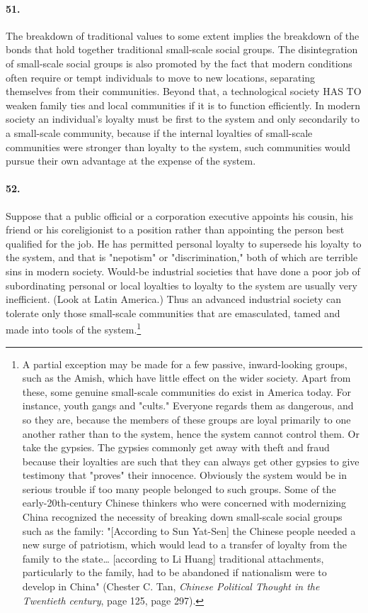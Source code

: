 \documentclass[12pt]{book}
\begin{document}
\paragraph{51.} The breakdown of traditional values to some extent implies the breakdown of the bonds that hold together traditional small-scale social groups. The disintegration of small-scale social groups is also promoted by the fact that modern conditions often require or tempt individuals to move to new locations, separating themselves from their communities.  Beyond that, a technological society HAS TO weaken family ties and local communities if it is to function efficiently. In modern society an individual's loyalty must be first to the system and only secondarily to a small-scale community, because if the internal loyalties of small-scale communities were stronger than loyalty to the system, such communities would pursue their own advantage at the expense of the system.


\paragraph{52.} Suppose that a public official or a corporation executive appoints his cousin, his friend or his coreligionist to a position rather than appointing the person best qualified for the job. He has permitted personal loyalty to supersede his loyalty to the system, and that is "nepotism" or "discrimination," both of which are terrible sins in modern society.  Would-be industrial societies that have done a poor job of subordinating personal or local loyalties to loyalty to the system are usually very inefficient. (Look at Latin America.) Thus an advanced industrial society can tolerate only those small-scale communities that are emasculated, tamed and made into tools of the system.\footnote{A partial exception may be made for a few passive, inward-looking groups, such as the Amish, which have little effect on the wider society. Apart from these, some genuine small-scale communities do exist in America today. For instance, youth gangs and "cults." Everyone regards them as dangerous, and so they are, because the members of these groups are loyal primarily to one another rather than to the system, hence the system cannot control them. Or take the gypsies. The gypsies commonly get away with theft and fraud because their loyalties are such that they can always get other gypsies to give testimony that "proves" their innocence. Obviously the system would be in serious trouble if too many people belonged to such groups. Some of the early-20th-century Chinese thinkers who were concerned with modernizing China recognized the necessity of breaking down small-scale social groups such as the family: "[According to Sun Yat-Sen] the Chinese people needed a new surge of patriotism, which would lead to a transfer of loyalty from the family to the state\dots{} [according to Li Huang] traditional attachments, particularly to the family, had to be abandoned if nationalism were to develop in China" (Chester C. Tan, \emph{Chinese Political Thought in the Twentieth century}, page 125, page 297).}
\end{document}
